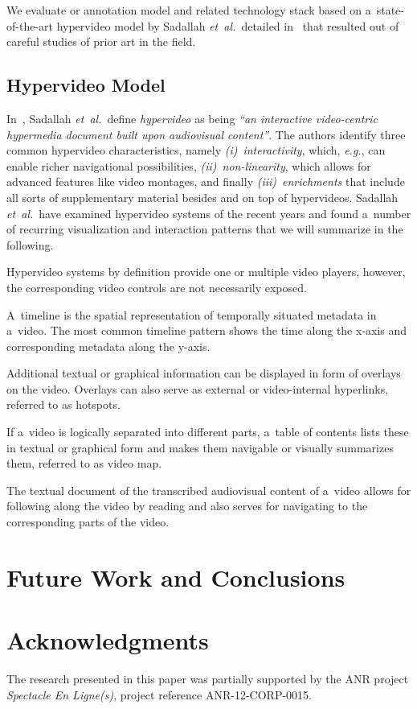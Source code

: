 \documentclass{sig-alternate}
\begin{document}
We evaluate or annotation model and related technology stack
based on a~state-of-the-art hypervideo model by
Sadallah \emph{et~al.}\ detailed in~\cite{sadallah2012hypervideo}
that resulted out of careful studies of prior art in the field.

\subsection{Hypervideo Model}

In~\cite{sadallah2012hypervideo}, Sadallah \emph{et~al.}\ define
\emph{hypervideo} as being \textit{``an interactive video-centric
hypermedia document built upon audiovisual content''}.
The authors identify three common hypervideo characteristics,
namely \emph{(i)}~\emph{interactivity}, which, \emph{e.g.},
can enable richer navigational possibilities, 
\emph{(ii)}~\emph{non-linearity}, which allows for advanced features
like video montages, and finally \emph{(iii)}~\emph{enrichments}
that include all sorts of supplementary material besides
and on top of hypervideos.
Sadallah \emph{et~al.}\ have examined hypervideo systems
of the recent years and found a~number of
recurring visualization and interaction patterns
that we will summarize in the following.

\begin{description}[leftmargin=*]
  \item[Video player and controls:] Hypervideo systems by definition
    provide one or multiple video players, however,
    the corresponding video controls are not necessarily exposed.
  \item[Timeline:] A~timeline is the spatial representation
    of temporally situated metadata in a~video.
    The most common timeline pattern shows the
    time along the x-axis and corresponding metadata along the y-axis.
  \item[Textual or graphical overlay:] Additional textual or graphical
    information can be displayed in form of overlays on the video.
    Overlays can also serve as external or video-internal hyperlinks,
    referred to as hotspots.
  \item[Textual or graphical table of contents:]
    If a~video is logically separated
    into different parts, a~table of contents lists these
    in textual or graphical form and makes them navigable
    or visually summarizes them, referred to as video map.
  \item[Transcript:] The textual document
    of the transcribed audiovisual content of a~video 
    allows for following along the video by reading
    and also serves for navigating to the corresponding
    parts of the video.
\end{description}  

\section{Future Work and Conclusions}

\section*{Acknowledgments}

The research presented in this paper
was partially supported by the ANR project
\emph{Spectacle En Ligne(s)}, project reference
\mbox{ANR-12-CORP-0015}.



\end{document}
